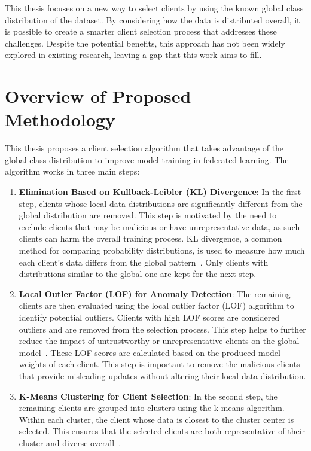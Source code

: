 This thesis focuses on a new way to select clients by using the known global
class distribution of the dataset. By considering how the data is distributed
overall, it is possible to create a smarter client selection process that
addresses these challenges. Despite the potential benefits, this approach has
not been widely explored in existing research, leaving a gap that this work
aims to fill.

\section{Overview of Proposed Methodology}
This thesis proposes a client selection algorithm that takes advantage of the
global class distribution to improve model training in federated learning. The
algorithm works in three main steps:

\begin{enumerate}
      \item \textbf{Elimination Based on Kullback-Leibler (KL) Divergence}: In
            the first step, clients whose local data distributions are
            significantly
            different from the global distribution are removed. This step is
            motivated by
            the need to exclude clients that may be malicious or have
            unrepresentative
            data, as such clients can harm the overall training process. KL
            divergence, a
            common method for comparing probability distributions, is used to
            measure how
            much each client's data differs from the global
            pattern~\cite{hershey2007approximating}. Only clients with
            distributions
            similar to the
            global one are kept for the next step.
      \item \textbf{Local Outler Factor (LOF) for Anomaly Detection}: The
            remaining clients are then evaluated using the local outlier factor
            (LOF)
            algorithm to identify potential outliers. Clients with high LOF
            scores are
            considered outliers and are removed from the selection process.
            This
            step helps
            to further reduce the impact of untrustworthy or unrepresentative
            clients on
            the global model~\cite{breunig2000lof}. These LOF scores are
            calculated based
            on the produced model weights of each client. This step is
            important
            to remove
            the malicious clients that provide misleading updates without
            altering their
            local data distribution.
      \item \textbf{K-Means Clustering for Client Selection}: In the second
            step,
            the remaining clients are grouped into clusters using the k-means
            algorithm.
            Within each cluster, the client whose data is closest to the
            cluster
            center is
            selected. This ensures that the selected clients are both
            representative of
            their cluster and diverse overall~\cite{lloyd1982least}.
\end{enumerate}

